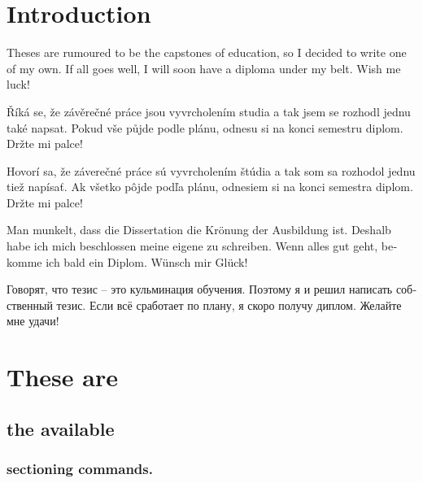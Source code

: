 \documentclass[
  digital, %
  table,   %
  lof,     %
  lot,     %
]{fithesis3}
\begin{document}
\chapter{Introduction}
Theses are rumoured to be the capstones of education, so I decided
to write one of my own. If all goes well, I will soon have a
diploma under my belt. Wish me luck!

\begin{otherlanguage}{czech}
Říká se, že závěrečné práce jsou vyvrcholením studia a tak jsem se
rozhodl jednu také napsat. Pokud vše půjde podle plánu, odnesu si
na konci semestru diplom. Držte mi palce!
\end{otherlanguage}

\begin{otherlanguage}{slovak}
Hovorí sa, že záverečné práce sú vyvrcholením štúdia a tak som sa
rozhodol jednu tiež napísať. Ak všetko pôjde podľa plánu, odnesiem
si na konci semestra diplom. Držte mi palce!
\end{otherlanguage}

\begin{otherlanguage}{german}
Man munkelt, dass die Dissertation die Krönung der Ausbildung ist.
Deshalb habe ich mich beschlossen meine eigene zu schreiben. Wenn
alles gut geht, bekomme ich bald ein Diplom. Wünsch mir Glück!
\end{otherlanguage}

\begin{otherlanguage}{russian}
Говорят, что тезис -- это кульминация обучения. Поэтому я и решил
написать собственный тезис. Если всё сработает по плану, я скоро
получу диплом. Желайте мне удачи!
\end{otherlanguage}

\chapter{These are}
\section{the available}
\subsection{sectioning commands.}
\end{document}
